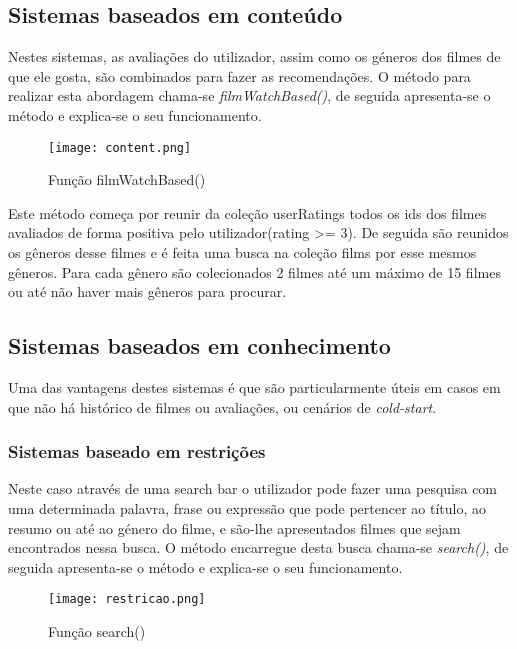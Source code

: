\subsection{Sistemas baseados em conteúdo}

Nestes sistemas, as avaliações do utilizador, assim como os géneros dos filmes de que ele gosta, são combinados para fazer as recomendações.
O método para realizar esta abordagem chama-se \textit{filmWatchBased()}, de seguida apresenta-se o método e explica-se o seu funcionamento.

\begin{figure}[H]
\centering
\texttt{[image: content.png]}
\caption {Função filmWatchBased()}
\label {fig02}
\end{figure}

Este método começa por reunir da coleção userRatings todos os ids dos filmes avaliados de forma positiva pelo utilizador(rating >= 3). De seguida são reunidos os gêneros desse filmes e é feita uma busca na coleção films por esse mesmos gêneros. Para cada gênero são colecionados 2 filmes até um máximo de 15 filmes ou até não haver mais gêneros para procurar.


\subsection{Sistemas baseados em conhecimento}


Uma das vantagens destes sistemas é que são particularmente úteis em casos em que não há histórico de filmes ou avaliações, ou cenários de \textit{cold-start}.

\subsubsection{Sistemas baseado em restrições}

Neste caso através de uma search bar o utilizador pode fazer uma pesquisa com uma determinada palavra, frase ou expressão que pode pertencer ao título, ao resumo ou até ao género do filme, e são-lhe apresentados filmes que sejam encontrados nessa busca.
O método encarregue desta busca chama-se \textit{search()}, de seguida apresenta-se o método e explica-se o seu funcionamento.

\begin{figure}[H]
\centering
\texttt{[image: restricao.png]}
\caption {Função search()}
\label {fig03}
\end{figure}
 
